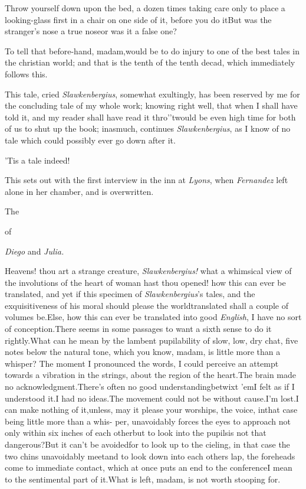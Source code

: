 \documentclass{article}
\begin{document}
\tsk Throw yourself down upon the bed, a dozen times\tsk
taking care only to place a looking-glass first in a chair
on one side of it, before you do it\tsh But was the
stranger’s nose a true nose\tsk or was it a false one?

To tell that before-hand, madam,\break would be to do injury to one of
the best tales in the christian world; and that is the tenth of the
tenth decad, which immediately follows this.

This tale, cried \textit{Slawkenbergius}, somewhat exultingly, has
been reserved by me for the concluding tale of my whole work;
knowing right well, that when I shall have told it, and my reader
shall have read it thro’\tsk ’twould be even high
time for both of us to shut up the book; inasmuch, continues
\textit{Slawkenbergius}, as I know of no tale which could possibly
ever go down after it.

\tsh ’Tis a tale indeed!

This sets out with the first interview in the inn at
\textit{Lyons}, when \textit{Fernandez} left 
alone in her chamber, and is overwritten.

\bigskip
\centerline{The\enspace{}}
\centerline{of}
\centerline{\textit{Diego} and \textit{Julia.}}

Heavens! thou art a strange creature, \textit{Slawkenbergius!}
what a whimsical view of the involutions of the heart of woman hast
thou opened! how this can ever be translated, and yet if this
specimen of \textit{Slawkenbergius}’s tales, and the
exquisitiveness of his moral should please the
world\tsk translated shall a couple of volumes
be.\tsk Else, how this can ever be translated into good
\textit{English}, I have no sort of conception.\tsk There seems in
some passages to want a sixth sense to do it
rightly.\tsh What can he mean by the\break 
lambent pupilability of slow, low, dry\break
chat, five notes below the natural tone,\break
\tsh which you know, madam, is little more than a
whisper? The moment I pronounced the words, I could perceive an
attempt towards a vibration in the strings, about the region of the
heart.\tsh The brain made no
acknowledgment.\tsh There’s often no good
understanding\break betwixt ’em\tsk I felt as if I understood
it.\tsk I had no ideas.\tsk The movement could
not be without cause.\tsk I’m lost.\break I can make nothing of
it,\tsk unless, may\break
it please your worships, the voice, in\break that
case being little more than a whis-\break
per, unavoidably forces the eyes to\break
approach not only within six inches\break
of each other\tsk but to look into the\break
pupils\tsk is not that dangerous?\tsh But it\break
can’t be avoided\tsk for to look up to the cieling, in
that case the two chins unavoidably meet\tsk and to look
down into each others lap, the foreheads come to immediate
contact, which at once puts an end to the conference\tsk I
mean to the sentimental part of it.\tsh What is left,
madam, is not worth stooping for.
\end{document}
